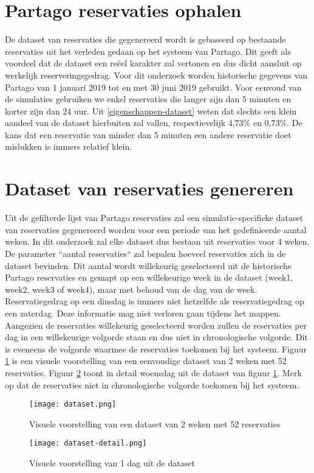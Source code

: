 \section{Partago reservaties ophalen} \label{partago-reservaties-ophalen}
De dataset van reservaties die gegenereerd wordt is gebaseerd op bestaande reservaties uit het verleden gedaan op het systeem van Partago. Dit geeft als voordeel dat de dataset een reëel karakter zal vertonen en dus dicht aansluit op werkelijk reserveringsgedrag. Voor dit onderzoek worden historische gegevens van Partago van 1 januari 2019 tot en met 30 juni 2019 gebruikt. Voor eenvoud van de simulaties gebruiken we enkel reservaties die langer zijn dan 5 minuten en korter zijn dan 24 uur. Uit \ref{eigenschappen-dataset} weten dat slechts een klein aandeel van de dataset hierbuiten zal vallen, respectievelijk 4,73\% en 0,73\%. De kans dat een reservatie van minder dan 5 minuten een andere reservatie doet mislukken is immers relatief klein.

\section{Dataset van reservaties genereren} \label{dataset-genereren}
Uit de gefilterde lijst van Partago reservaties zal een simulatie-specifieke dataset van reservaties gegenereerd worden voor een periode van het gedefinieerde aantal weken. In dit onderzoek zal elke dataset dus bestaan uit reservaties voor 4 weken. De parameter ``aantal reservaties`` zal bepalen hoeveel reservaties zich in de dataset bevinden. Dit aantal wordt willekeurig geselecteerd uit de historische Partago reservaties en gemapt op een willekeurige week in de dataset (week1, week2, week3 of week4), maar met behoud van de dag van de week. Reservatiegedrag op een dinsdag is immers niet hetzelfde als reservatiegedrag op een zaterdag. Deze informatie mag  niet verloren gaan tijdens het mappen. Aangezien de reservaties willekeurig geselecteerd worden zullen de reservaties per dag in een willekeurige volgorde staan en dus niet in chronologische volgorde. Dit is eveneens de volgorde waarmee de reservaties toekomen bij het systeem. Figuur \ref{fig:visuele-voorstelling-dataset} is een visuele voorstelling van een eenvoudige dataset van 2 weken met 52 reservaties. Figuur \ref{fig:visuele-voorstelling-dag-dataset} toont in detail woensdag uit de dataset van figuur \ref{fig:visuele-voorstelling-dataset}. Merk op dat de reservaties niet in chronologische volgorde toekomen bij het systeem.
\begin{figure}[h]
	\texttt{[image: dataset.png]}
	\caption[Visuele voorstelling van een dataset]{Visuele voorstelling van een dataset van 2 weken met 52 reservaties}
	\label{fig:visuele-voorstelling-dataset}
\end{figure}
\begin{figure}[h]
	\texttt{[image: dataset-detail.png]}
	\caption[Visuele voorstelling van 1 dag in de dataset]{Visuele voorstelling van 1 dag uit de dataset}
	\label{fig:visuele-voorstelling-dag-dataset}
\end{figure}
